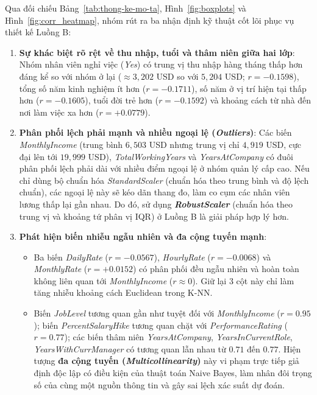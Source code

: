 Qua đối chiếu Bảng~\ref{tab:thong-ke-mo-ta}, Hình~\ref{fig:boxplots} và Hình~\ref{fig:corr_heatmap}, nhóm rút ra ba nhận định kỹ thuật cốt lõi phục vụ thiết kế Luồng B:
\begin{enumerate}
    \item \textbf{Sự khác biệt rõ rệt về thu nhập, tuổi và thâm niên giữa hai lớp}: Nhóm nhân viên nghỉ việc (\textit{Yes}) có trung vị thu nhập hàng tháng thấp hơn đáng kể so với nhóm ở lại ($\approx 3,202$ USD so với $5,204$ USD; $r = -0.1598$), tổng số năm kinh nghiệm ít hơn ($r = -0.1711$), số năm ở vị trí hiện tại thấp hơn ($r = -0.1605$), tuổi đời trẻ hơn ($r = -0.1592$) và khoảng cách từ nhà đến nơi làm việc xa hơn ($r = +0.0779$).
    \item \textbf{Phân phối lệch phải mạnh và nhiều ngoại lệ (\textit{Outliers})}: Các biến \textit{MonthlyIncome} (trung bình $6,503$ USD nhưng trung vị chỉ $4,919$ USD, cực đại lên tới $19,999$ USD), \textit{TotalWorkingYears} và \textit{YearsAtCompany} có đuôi phân phối lệch phải dài với nhiều điểm ngoại lệ ở nhóm quản lý cấp cao. Nếu chỉ dùng bộ chuẩn hóa \textit{StandardScaler} (chuẩn hóa theo trung bình và độ lệch chuẩn), các ngoại lệ này sẽ kéo dãn thang đo, làm co cụm các nhân viên lương thấp lại gần nhau. Do đó, sử dụng \textbf{\textit{RobustScaler}} (chuẩn hóa theo trung vị và khoảng tứ phân vị IQR) ở Luồng B là giải pháp hợp lý hơn.
    \item \textbf{Phát hiện biến nhiễu ngẫu nhiên và đa cộng tuyến mạnh}:
    \begin{itemize}
        \item Ba biến \textit{DailyRate} ($r = -0.0567$), \textit{HourlyRate} ($r = -0.0068$) và \textit{MonthlyRate} ($r = +0.0152$) có phân phối đều ngẫu nhiên và hoàn toàn không liên quan tới \textit{MonthlyIncome} ($r \approx 0$). Giữ lại $3$ cột này chỉ làm tăng nhiễu khoảng cách Euclidean trong K-NN.
        \item Biến \textit{JobLevel} tương quan gần như tuyệt đối với \textit{MonthlyIncome} ($r = \mathbf{0.95}$); biến \textit{PercentSalaryHike} tương quan chặt với \textit{PerformanceRating} ($r = \mathbf{0.77}$); các biến thâm niên \textit{YearsAtCompany}, \textit{YearsInCurrentRole}, \textit{YearsWithCurrManager} có tương quan lẫn nhau từ $0.71$ đến $0.77$. Hiện tượng \textbf{đa cộng tuyến (\textit{Multicollinearity})} này vi phạm trực tiếp giả định độc lập có điều kiện của thuật toán Naive Bayes, làm nhân đôi trọng số của cùng một nguồn thông tin và gây sai lệch xác suất dự đoán.
    \end{itemize}
\end{enumerate}

